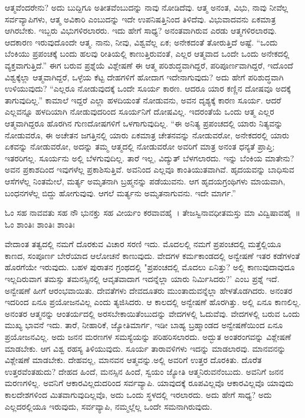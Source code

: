 ಆತ್ಮವೆಂದರೇನು? ಅದು ಬುದ್ದಿಗೂ ಅತೀತವೆಂಬುದನ್ನು ನಾವು ನೋಡಿದೆವು. ಆತ್ಮ ಅನಂತ, ವಿಭು, ನಾವು ನೀವೆಲ್ಲ ಸರ್ವವ್ಯಾಪಿಗಳು, ಆತ್ಮ ಅವಿಕಾರಿ ಎಂಬುದನ್ನು ಇದೇ ಉಪನಿಷತ್ತಿನಿಂದ ತಿಳಿದೆವು. ವಿಭುವಾದವನು ಏಕಮಾತ್ರ ಆಗಿರಬೇಕು. ಇಬ್ಬರು ವಿಭುಗಳಿರಲಾರರು. ಇದು ಹೇಗೆ ಸಾಧ್ಯ? ಅನಂತವಾಗಿರುವ ಎರಡು ಆತ್ಮಗಳಿರಲಾರವು. ಆದಕಾರಣ ಇರುವುದೊಂದೇ ಆತ್ಮ. ನಾನು, ನೀವು, ವಿಶ್ವವೆಲ್ಲ ಏಕ; ಅನೇಕದಂತೆ ತೋರುತ್ತಿದೆ ಅಷ್ಟೆ. “ಒಂದು ಬೆಂಕಿಯು ಪ್ರಪಂಚಕ್ಕೆ ಬಂದು ಹಲವು ರೀತಿಯಲ್ಲಿ ಕಾಣುತ್ತಿರುವಂತೆ, ಎಲ್ಲರ ಆತ್ಮವಾದ ಒಂದೇ ಒಂದು ಅನೇಕದಲ್ಲಿ ವ್ಯಕ್ತವಾಗುತ್ತಿದೆ.” ಈಗ ಬರುವ ಪ್ರಶ್ನೆಯೆ ವಿಶ್ಲೇಷಣೆ ಈ ಆತ್ಮ ಪರಿಶುದ್ಧವಾಗಿದ್ದರೆ, ಪರಿಪೂರ್ಣವಾಗಿದ್ದರೆ, ಇದೊಂದೆ ವಿಶ್ವಕ್ಕೆಲ್ಲಾ ಆತ್ಮವಾಗಿದ್ದರೆ, ಒಳ್ಳೆಯ ಕೆಟ್ಟ ದೇಹಗಳಿಗೆ ಹೋದಾಗ ಇದೇನಾಗುವುದು? ಅದು ಹೇಗೆ ಪರಿಶುದ್ಧವಾಗಿ ಉಳಿಯುವುದು? “ಎಲ್ಲರೂ ನೋಡುವುದಕ್ಕೆ ಒಂದೇ ಸೂರ್ಯ ಕಾರಣ. ಆದರೂ ಯಾರ ಕಣ್ಣಿನ ದೋಷವೂ ಅದಕ್ಕೆ ತಾಗುವುದಿಲ್ಲ.” ಕಾಮಾಲೆ ಇದ್ದರೆ ಎಲ್ಲಾ ಹಳದಿಯಂತೆ ನೋಡುವನು, ಅವನ ದೃಶ್ಯಕ್ಕೆ ಕಾರಣ ಸೂರ್ಯ. ಆದರೆ ಎಲ್ಲವನ್ನೂ ಹಳದಿಯಾಗಿ ನೋಡುವುದರಿಂದ ಸೂರ್ಯನಿಗೆ ದೋಷವಿಲ್ಲ. ಇದರಂತೆಯೆ ಒಂದು ಆತ್ಮ ಎಲ್ಲರ ಆತ್ಮವಾಗಿದ್ದರೂ ಹೊರಗಿನ ಗುಣದೋಷಗಳಿಗೆ ಒಳಗಾಗುವುದಿಲ್ಲ. “ಈ ಅನಿತ್ಯ ಪ್ರಪಂಚದಲ್ಲಿ ಯಾರು ನಿತ್ಯವನ್ನು ನೋಡುವರೊ, ಈ ಅಚೇತನ ಜಗತ್ತಿನಲ್ಲಿ ಯಾರು ಏಕಮಾತ್ರ ಚೇತನವನ್ನು ನೋಡುವರೋ, ಅನೇಕದರಲ್ಲಿ ಯಾರು ಏಕವನ್ನು ನೋಡುವರೋ, ಅದನ್ನು ತಮ್ಮ ಆತ್ಮದಲ್ಲಿ ನೋಡುವರೋ ಅವರಿಗೆ ಮಾತ್ರ ಅನಂತ ಧನ್ಯತೆ ಪ್ರಾಪ್ತಿ; ಇತರರಿಗಲ್ಲ. ಸೂರ್ಯನು ಅಲ್ಲಿ ಬೆಳಗುವುದಿಲ್ಲ. ತಾರೆ ಇಲ್ಲ, ವಿದ್ಯುತ್ ಬೆಳಗಲಾರದು. ಇನ್ನು ಬೆಂಕಿಯ ಮಾತೇನು? ಅವನ ಪ್ರಕಾಶದಿಂದ ಇವುಗಳೆಲ್ಲ ಪ್ರಕಾಶಿಸುತ್ತಿವೆ. ಅವನಿಂದ ಎಲ್ಲವೂ ಕಾಂತಿಯುತವಾಗಿವೆ. ಹೃದಯವನ್ನು ಬಾಧಿಸುವ ಆಸೆಗಳೆಲ್ಲ ನಿಂತಮೇಲೆ, ಮರ್ತ್ಯ ಅಮೃತನಾಗಿ ಬ್ರಹ್ಮನನ್ನು ಪಡೆಯುವನು. ಆಗ ಹೃದಯಗ್ರಂಥಿಗಳು ಮಾಯವಾಗಿ, ಬಂಧನಗಳೆಲ್ಲ ಬಿದ್ದು ಹೋಗುವುವು. ಆಗಲೆ ಮರ್ತ್ಯನು ಅಮೃತನಾಗುವನು. ಇದೇ ಮಾರ್ಗ.”

ಓಂ ಸಹ ನಾವವತು ಸಹ ನೌ ಭುನಕ್ತು ಸಹ ವೀರ್ಯಂ ಕರವಾವಹೈ~। ತೇಜಸ್ವಿನಾವಧೀತಮಸ್ತು ಮಾ ವಿದ್ವಿಷಾವಹೈ~॥ ಓಂ ಶಾಂತಿಃ ಶಾಂತಿಃ ಶಾಂತಿಃ

ವೇದಾಂತ ತತ್ವದಲ್ಲಿ ನಮಗೆ ದೊರಕುವ ವಿಚಾರ ಸರಣಿ ಇದು. ಮೊದಲಲ್ಲಿ ನಮಗೆ ಪ್ರಪಂಚದಲ್ಲಿ ಮತ್ತೆಲ್ಲಿಯೂ ಕಾಣದ, ಸಂಪೂರ್ಣ ಬೇರೆಯಾದ ಆಲೋಚನೆ ಕಾಣುವುದು. ವೇದಗಳ ಕರ್ಮಕಾಂಡದಲ್ಲಿ ಅನ್ವೇಷಣೆ ಇತರ ಕಡೆಗಳಂತೆ ಹೊರಗೆಯೇ ಇರುವುದು. ಬಹಳ ಪುರಾತನ ಗ್ರಂಥದಲ್ಲಿ "ಪ್ರಪಂಚದಲ್ಲಿ ಮೊದಲು ಏನಿತ್ತು? ಅಲ್ಲಿ ಕಾಣುವುದಾವುದೂ ಇಲ್ಲದಿರುವಾಗ ತಮಸ್ಸು ತಮನಸ್ಸಿನಲ್ಲಿ ಆವೃತವಾದಾಗ ಇದನ್ನೆಲ್ಲಾ ಯಾರು ನಿರ್ಮಿಸಿದರು?' ಎಂಬ ಪ್ರಶ್ನೆ ಇದೆ. ಅನ್ವೇಷಣೆ ಹೀಗೆ ಆರಂಭವಾಯಿತು. ದೇವತೆಗಳು ದೇವದೂತರು ಮುಂತಾದುವನ್ನೆಲ್ಲಾ ಹೇಳತೊಡಗಿದರು. ಅನಂತರ ಇದರಿಂದ ಏನೂ ಪ್ರಯೋಜನವಿಲ್ಲ ಎಂದು ತ್ಯಜಿಸಿದರು. ಆ ಕಾಲದಲ್ಲಿ ಅನ್ವೇಷಣೆ ಹೊರಗಿತ್ತು. ಅಲ್ಲಿ ಏನೂ ಕಾಣಲಿಲ್ಲ. ಅನಂತರ ಆತ್ಮನನ್ನು ಆಂತರ್ಯದಲ್ಲಿ ಅರಸಬೇಕಾಯಿತೆಂಬುದನ್ನು ವೇದಗಳಲ್ಲಿ ಓದುವೆವು. ವೇದಗಳಲ್ಲಿ ಬರುವ ಒಂದು ಮುಖ್ಯ ಭಾವನೆ ಇದು. ತಾರೆ, ನೀಹಾರಿಕೆ, ಜ್ಯೋತಿಮಾರ್ಗ, ಇಡೀ ಬಾಹ್ಯ ಬ್ರಹ್ಮಾಂಡದ ಅನ್ವೇಷಣೆಯಿಂದ ಏನೂ ಪ್ರಯೋಜನವಿಲ್ಲ. ಅದು ಜನನ ಮರಣಗಳ ಸಮಸ್ಯೆಯನ್ನು ಪರಿಹರಿಸಲಾರದು. ಅದ್ಭುತ ಅಂತರಂಗವನ್ನು ವಿಶ್ಲೇಷಣೆ ಮಾಡಬೇಕು. ಆಗ ವಿಶ್ವ ರಹಸ್ಯ ತಿಳಿಯುವುದು. ಸೂರ್ಯ ತಾರಾವಳಿಗಳು ಇದನ್ನು ಮಾಡಲಾರವು. ಮಾನವನನ್ನು ವಿಶ್ಲೇಷಣೆ ಮಾಡಬೇಕು. ದೇಹವಲ್ಲ, ಮಾನವನ ಆತ್ಮವನ್ನು.ಅಲ್ಲಿ ಅವರಿಗೆ ಉತ್ತರ ದೊರಕಿತು. ದೊರೆತ ಉತ್ತರವೆಂತಹುದು? ದೇಹದ ಹಿಂದೆ, ಮನಸ್ಸಿನ ಹಿಂದೆ, ಸ್ವಯಂ ಜ್ಯೋತಿ ಆತ್ಮನಿರುವನೆಂಬುದು. ಅವನಿಗೆ ಜನನ ಮರಣಗಳಿಲ್ಲ. ಅವನಿಗೆ ಆಕಾರವಿಲ್ಲದುದರಿಂದ ಸರ್ವವ್ಯಾಪಿ. ಯಾವುದಕ್ಕೆ ರೂಪವಿಲ್ಲವೊ ಆಕಾರವಿಲ್ಲವೊ ಯಾವುದು ಕಾಲದೇಶಗಳಿಂದ ಮಿತವಾಗುವುದಿಲ್ಲವೊ, ಅದು ಒಂದು ಸ್ಥಳದಲ್ಲಿ ಇರಲಾರದು. ಅದು ಹೇಗೆ ಸಾಧ್ಯ? ಅದು ಎಲ್ಲದರಲ್ಲಿಯೂ ಇರುವುದು, ಸರ್ವವ್ಯಾಪಿ, ನಮ್ಮಲ್ಲೆಲ್ಲ ಒಂದೇ ಸಮನಾಗಿರುವುದು.

